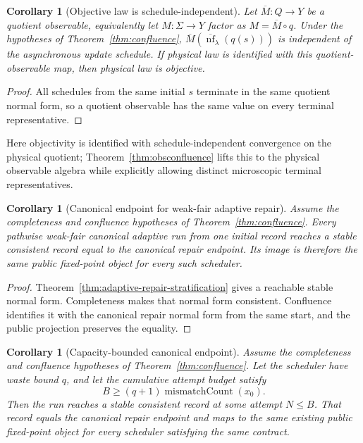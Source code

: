 \documentclass[11pt]{article}
\newtheorem{corollary}[theorem]{Corollary}
\theoremstyle{remark}
\theoremstyle{plain}
\begin{document}
\begin{corollary}[Objective law is schedule-independent]\label{cor:objective}
Let \(\overline M:Q\to Y\) be a quotient observable, equivalently let
\(M:\Sigma\to Y\) factor as \(M=\overline M\circ q\). Under the hypotheses of
Theorem~\ref{thm:confluence},
\(\overline M(\overline{\operatorname{nf}}_\lambda(q(s)))\) is independent of
the asynchronous update schedule. If physical law is identified with this
quotient-observable map, then physical law is objective.
\end{corollary}

\begin{proof}
All schedules from the same initial \(s\) terminate in the same quotient
normal form, so a quotient observable has the same value on every terminal
representative.
\end{proof}

Here objectivity is identified with schedule-independent convergence on the
physical quotient; Theorem~\ref{thm:obsconfluence} lifts this to the physical
observable algebra while explicitly allowing distinct microscopic terminal
representatives.

\begin{corollary}[Canonical endpoint for weak-fair adaptive repair]
\label{cor:adaptive-canonical-public-endpoint}
Assume the completeness and confluence hypotheses of
Theorem~\ref{thm:confluence}.  Every pathwise weak-fair canonical adaptive run
from one initial record reaches a stable consistent record equal to the
canonical repair endpoint.  Its image is therefore the same public fixed-point
object for every such scheduler.
\end{corollary}

\begin{proof}
Theorem~\ref{thm:adaptive-repair-stratification} gives a reachable stable
normal form.  Completeness makes that normal form consistent.  Confluence
identifies it with the canonical repair normal form from the same start, and
the public projection preserves the equality.
\end{proof}

\begin{corollary}[Capacity-bounded canonical endpoint]
\label{cor:capacity-bounded-canonical-endpoint}
Assume the completeness and confluence hypotheses of
Theorem~\ref{thm:confluence}.  Let the scheduler have waste bound \(q\), and
let the cumulative attempt budget satisfy
\[
B\ge(q+1)\operatorname{mismatchCount}(x_0).
\]
Then the run reaches a stable consistent record at some attempt \(N\le B\).
That record equals the canonical repair endpoint and maps to the same existing
public fixed-point object for every scheduler satisfying the same contract.
\end{corollary}
\end{document}
